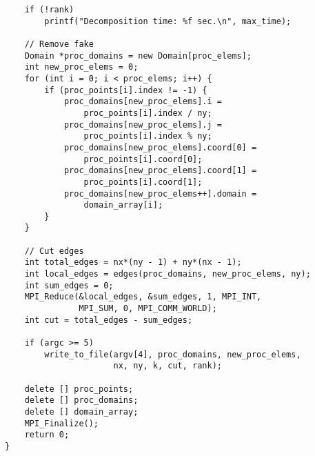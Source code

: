 \documentclass[oneside,final,14pt]{extreport}
\begin{document}
\begin{verbatim}
    if (!rank)
        printf("Decomposition time: %f sec.\n", max_time);

    // Remove fake
    Domain *proc_domains = new Domain[proc_elems];
    int new_proc_elems = 0;
    for (int i = 0; i < proc_elems; i++) {
        if (proc_points[i].index != -1) {
            proc_domains[new_proc_elems].i =
                proc_points[i].index / ny;
            proc_domains[new_proc_elems].j =
                proc_points[i].index % ny;
            proc_domains[new_proc_elems].coord[0] =
                proc_points[i].coord[0];
            proc_domains[new_proc_elems].coord[1] =
                proc_points[i].coord[1];
            proc_domains[new_proc_elems++].domain =
                domain_array[i];
        }
    }

    // Cut edges
    int total_edges = nx*(ny - 1) + ny*(nx - 1);
    int local_edges = edges(proc_domains, new_proc_elems, ny);
    int sum_edges = 0;
    MPI_Reduce(&local_edges, &sum_edges, 1, MPI_INT,
               MPI_SUM, 0, MPI_COMM_WORLD);
    int cut = total_edges - sum_edges;

    if (argc >= 5)
        write_to_file(argv[4], proc_domains, new_proc_elems,
                      nx, ny, k, cut, rank);

    delete [] proc_points;
    delete [] proc_domains;
    delete [] domain_array;
    MPI_Finalize();
    return 0;
}

\end{verbatim}
\end{document}
